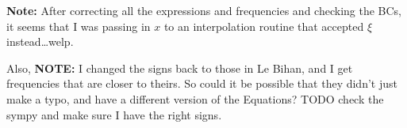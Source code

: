 \documentclass[11pt,
        usenames, %
        twocolumn,
        landscape,
        dvipsnames %
    ]{article}
\begin{document}
\textbf{Note:} After correcting all the expressions and frequencies and checking
the BCs, it seems that I was passing in $x$ to an interpolation routine that
accepted $\xi$ instead\dots welp.

Also, \textbf{NOTE:} I changed the signs back to those in Le Bihan, and I get frequencies
that are closer to theirs. So could it be possible that they didn't just make a
typo, and have a different version of the Equations? TODO check the sympy and
make sure I have the right signs.
\end{document}
